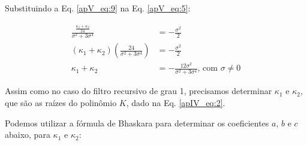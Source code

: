 Substituindo a Eq. \ref{apV_eq:9} na Eq. \ref{apV_eq:5}:




\begin{align}
\label{apV_eq:10}
\frac{\frac{\kappa_{1} + \kappa_{2}}{24}}{\sigma^{2} + 3\sigma^{4}} & = - \frac{\sigma^{2}}{2} \\
\label{apV_eq:11}
(\kappa_{1} + \kappa_{2}) \left( \frac{24}{\sigma^{2} + 3\sigma^{4}} \right) & = - \frac{\sigma^2}{2} \\
\label{apV_eq:12}
\kappa_{1} + \kappa_{2} & = - \frac{12\sigma^{2}}{\sigma^{2} + 3\sigma^{4}} \text{, com $\sigma \neq 0$}
\end{align}

Assim como no caso do filtro recursivo de grau 1, precisamos determinar $\kappa_{1}$ e $\kappa_{2}$, que são as raízes do polinômio $K$, dado na Eq. \ref{apIV_eq:2}.



Podemos utilizar a fórmula de Bhaskara para determinar os coeficientes $a$, $b$ e $c$ abaixo, para $\kappa_{1}$ e $\kappa_{2}$:



